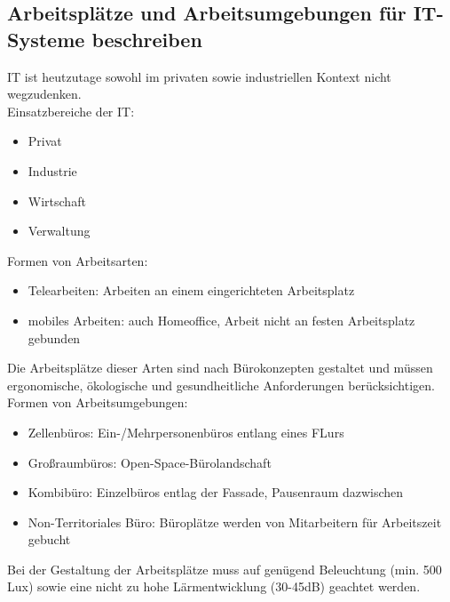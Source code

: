 \documentclass[11pt]{article}
\newlength{\subsectionindent}
\newenvironment{indentedtext}[1][\subsectionindent]
{%
  \begingroup
  \setlength{\leftskip}{#1}%
  \setlength{\parindent}{0pt}%
}
{%
  \par\endgroup
}
\begin{document}
\subsection{Arbeitsplätze und Arbeitsumgebungen für IT-Systeme beschreiben}
    \begin{indentedtext}
        IT ist heutzutage sowohl im privaten sowie industriellen Kontext nicht wegzudenken. \\
        Einsatzbereiche der IT:
    \end{indentedtext}
    \begin{itemize}[leftmargin=2.5cm, topsep=0.3em, itemsep=0.1em, parsep=0.5em]
        \item Privat
        \item Industrie
        \item Wirtschaft
        \item Verwaltung
    \end{itemize}
    \begin{indentedtext}
        Formen von Arbeitsarten:
    \end{indentedtext}
    \begin{itemize}[leftmargin=2.5cm, topsep=0.3em, itemsep=0.1em, parsep=0.5em]
        \item Telearbeiten: Arbeiten an einem eingerichteten Arbeitsplatz
        \item mobiles Arbeiten: auch Homeoffice, Arbeit nicht an festen Arbeitsplatz gebunden
    \end{itemize}
    \begin{indentedtext}
        Die Arbeitsplätze dieser Arten sind nach Bürokonzepten gestaltet und müssen ergonomische, ökologische und gesundheitliche Anforderungen berücksichtigen. \\
        Formen von Arbeitsumgebungen:
    \end{indentedtext}
    \begin{itemize}[leftmargin=2.5cm, topsep=0.3em, itemsep=0.1em, parsep=0.5em]
        \item Zellenbüros: Ein-/Mehrpersonenbüros entlang eines FLurs
        \item Großraumbüros: Open-Space-Bürolandschaft
        \item Kombibüro: Einzelbüros entlag der Fassade, Pausenraum dazwischen
        \item Non-Territoriales Büro: Büroplätze werden von Mitarbeitern für Arbeitszeit gebucht
    \end{itemize}
    \begin{indentedtext}
        Bei der Gestaltung der Arbeitsplätze muss auf genügend Beleuchtung (min. 500 Lux) sowie eine nicht zu hohe Lärmentwicklung (30-45dB) geachtet werden.
    \end{indentedtext}
\end{document}
